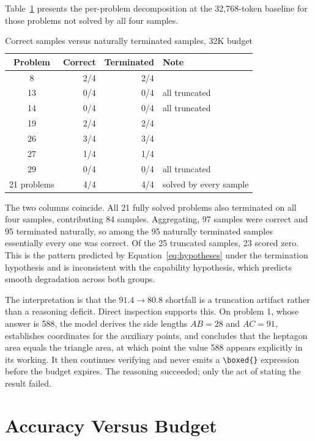 \documentclass[12pt,a4paper,oneside]{report}
\newcommand{\boxedans}{\texttt{\textbackslash boxed\{\}}}
\begin{document}
Table~\ref{tab:decomp} presents the per-problem decomposition at the 32{,}768-token
baseline for those problems not solved by all four samples.

\begin{table}[htbp]
\centering
\caption{Correct samples versus naturally terminated samples, 32K budget}
\label{tab:decomp}
\small
\begin{tabular}{@{}crrl@{}}
\toprule
\textbf{Problem} & \textbf{Correct} & \textbf{Terminated} & \textbf{Note} \\
\midrule
8  & 2/4 & 2/4 & \\
13 & 0/4 & 0/4 & all truncated \\
14 & 0/4 & 0/4 & all truncated \\
19 & 2/4 & 2/4 & \\
26 & 3/4 & 3/4 & \\
27 & 1/4 & 1/4 & \\
29 & 0/4 & 0/4 & all truncated \\
\midrule
21 problems & 4/4 & 4/4 & solved by every sample \\
\bottomrule
\end{tabular}
\end{table}

The two columns coincide. All 21 fully solved problems also terminated on all
four samples, contributing 84 samples. Aggregating, 97 samples were correct and
95 terminated naturally, so among the 95 naturally terminated samples
essentially every one was correct. Of the 25 truncated samples, 23 scored zero.
This is the pattern predicted by Equation~\eqref{eq:hypotheses} under the
termination hypothesis and is inconsistent with the capability hypothesis, which
predicts smooth degradation across both groups.

The interpretation is that the $91.4 \rightarrow 80.8$ shortfall is a truncation
artifact rather than a reasoning deficit. Direct inspection supports this. On
problem 1, whose answer is 588, the model derives the side lengths
$AB = 28$ and $AC = 91$, establishes coordinates for the auxiliary points, and
concludes that the heptagon area equals the triangle area, at which point the
value 588 appears explicitly in its working. It then continues verifying and
never emits a \boxedans{} expression before the budget expires. The reasoning
succeeded; only the act of stating the result failed.

\section{Accuracy Versus Budget}
\end{document}

